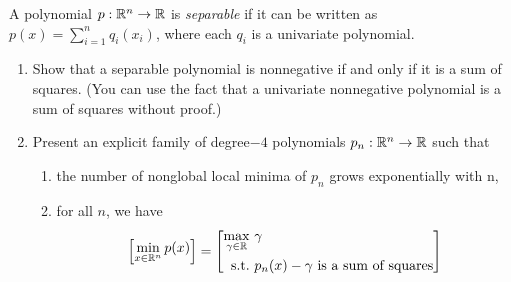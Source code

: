 \newpage

\pb
A polynomial $p : \mathbb{R}^{n} \to \mathbb{R}$ is \textit{separable} if it can be written as $p(x) = \sum_{i=1}^{n} q_{i}(x_{i})$, where each $q_{i}$ is a univariate polynomial.
\begin{enumerate}[leftmargin=*, label=(\alph*)]
\item Show that a separable polynomial is nonnegative if and only if it is a sum of squares. (You can use the fact that a univariate nonnegative polynomial is a sum of squares without proof.)
\item Present an explicit family of degree$-4$ polynomials $p_{n} : \mathbb{R}^{n} \to \mathbb{R}$ such that
\begin{enumerate}[label=(\roman*)]
\item the number of nonglobal local minima of $p_{n}$ grows exponentially with n,
\item for all $n$, we have
\begin{equation*}
\left[\begin{aligned}
\min_{x\in\mathbb{R}^{n}}p(x)
\end{aligned}\right] = 
\left[\begin{aligned}
\max_{\gamma\in\mathbb{R}}& ~\gamma\\
\text{s.t.}&~ p_{n}(x)-\gamma \text{ is a sum of squares}
\end{aligned}\right]
\end{equation*}
\end{enumerate}
\end{enumerate}


\soln

